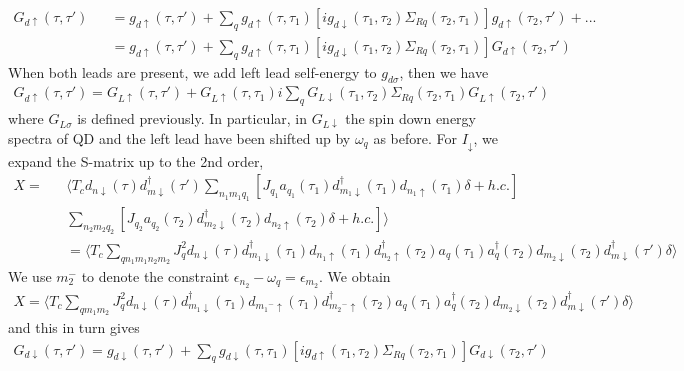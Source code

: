 \documentclass[aps,prb,superscriptaddress]{revtex4-2}
\begin{document}
\begin{eqnarray}
G_{d\uparrow}(\tau,\tau') &&= g_{d\uparrow}(\tau,\tau') + \sum_q  g_{d\uparrow}(\tau,\tau_1) [ig_{d\downarrow}(\tau_1,\tau_2)\Sigma_{Rq}(\tau_2,\tau_1)] g_{d\uparrow}(\tau_2,\tau') +... \nonumber \\
&&=g_{d\uparrow}(\tau,\tau') +\sum_q  g_{d\uparrow}(\tau,\tau_1) [ig_{d\downarrow}(\tau_1,\tau_2)\Sigma_{Rq}(\tau_2,\tau_1)] G_{d\uparrow}(\tau_2,\tau') \nonumber
\end{eqnarray}
When both leads are present, we add left lead self-energy to $g_{d\sigma}$, then we have
\begin{eqnarray}
G_{d\uparrow}(\tau,\tau') =G_{L\uparrow}(\tau,\tau') + G_{L\uparrow}(\tau,\tau_1) i\sum_q G_{L\downarrow}(\tau_1,\tau_2)\Sigma_{Rq}(\tau_2,\tau_1) G_{L\uparrow}(\tau_2,\tau') \label{relation4}
\end{eqnarray}
where $G_{L\sigma}$ is defined previously. In particular, in $G_{L\downarrow}$ the spin down energy spectra of QD and the left lead have been shifted up by $\omega_q$ as before. For $I_\downarrow$, we expand the S-matrix up to the 2nd order,
\begin{eqnarray}
X=&&\langle T_c d_{n\downarrow}(\tau) d^{\dagger}_{m\downarrow}(\tau') \sum_{n_1 m_1 q_1}[J_{q_1} a_{q_1}(\tau_1) d^{\dagger}_{m_1\downarrow}(\tau_1) d_{n_1\uparrow}(\tau_1)\delta +h.c.]\nonumber \\
&&\sum_{n_2 m_2 q_2}[J_{q_2} a_{q_2}(\tau_2) d^{\dagger}_{m_2\downarrow}(\tau_2) d_{n_2\uparrow}(\tau_2)\delta +h.c.]\rangle \nonumber \\
&&=\langle T_c \sum_{q n_1 m_1 n_2 m_2} J_q^2 d_{n\downarrow}(\tau)d^{\dagger}_{m_1\downarrow}(\tau_1) d_{n_1\uparrow}(\tau_1) d^{\dagger}_{n_2\uparrow}(\tau_2) a_{q}(\tau_1) a^\dagger_{q}(\tau_2) d_{m_2\downarrow}(\tau_2) d^{\dagger}_{m\downarrow}(\tau')\delta \rangle \nonumber
\end{eqnarray}
We use $m_2^-$ to denote the constraint $\epsilon_{n_2}-\omega_q= \epsilon_{m_2}$. We obtain
\begin{eqnarray}
X=\langle T_c \sum_{q m_1 m_2} J_q^2 d_{n\downarrow}(\tau)d^{\dagger}_{m_1\downarrow}(\tau_1) d_{{m_1}^-\uparrow}(\tau_1) d^{\dagger}_{{m_2}^-\uparrow}(\tau_2) a_{q}(\tau_1) a^\dagger_{q}(\tau_2) d_{m_2\downarrow}(\tau_2) d^{\dagger}_{m\downarrow}(\tau')\delta \rangle \nonumber
\end{eqnarray}
and this in turn gives
\begin{eqnarray}
 G_{d\downarrow}(\tau,\tau') = g_{d\downarrow}(\tau,\tau') + \sum_q g_{d\downarrow}(\tau,\tau_1) [ig_{d\uparrow}(\tau_1,\tau_2)\Sigma_{Rq}(\tau_2,\tau_1)] G_{d\downarrow}(\tau_2,\tau') \nonumber
\end{eqnarray}
\end{document}
